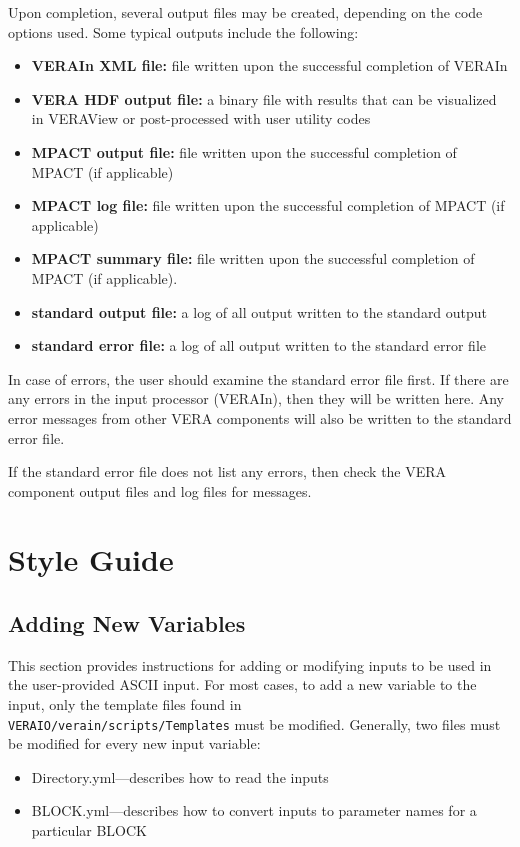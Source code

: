 \documentclass{vera-ornltm}
\begin{document}
Upon completion, several output files may be created, depending on the code options used.
Some typical outputs include the following:
\begin{itemize}
\item \textbf{VERAIn XML file:}  file written upon the successful completion of VERAIn
\item \textbf{VERA HDF output file:}  a binary file with results that can be visualized in VERAView or post-processed with user utility codes
\item \textbf{MPACT output file:} file written upon the successful completion of MPACT (if applicable)
\item \textbf{MPACT log file:} file written upon the successful completion of MPACT (if applicable)
\item \textbf{MPACT summary file:} file written upon the successful completion of MPACT (if applicable).
\item \textbf{standard output file:} a log of all output written to the standard output
\item \textbf{standard error file:} a log of all output written to the standard error file
\end{itemize}


In case of errors, the user should examine the standard error file first.
If there are any errors in the input processor (VERAIn), then they will be written here.
Any error messages from other VERA components will also be written to the standard error file.

If the standard error file does not list any errors, then check the VERA component output files and log files for messages.


\section{Style Guide}

\subsection{Adding New Variables}

This section provides instructions for adding or modifying inputs to be used in the user-provided ASCII input. For most cases, to add a new variable to the input, only the template files found in\\
\texttt{VERAIO/verain/scripts/Templates} must be modified. Generally, two files must be modified for every new input variable:
\begin{itemize}
    \item{Directory.yml}---describes how to read the inputs
    \item{BLOCK.yml}---describes how to convert inputs to parameter names for a particular BLOCK
\end{itemize}
\end{document}
